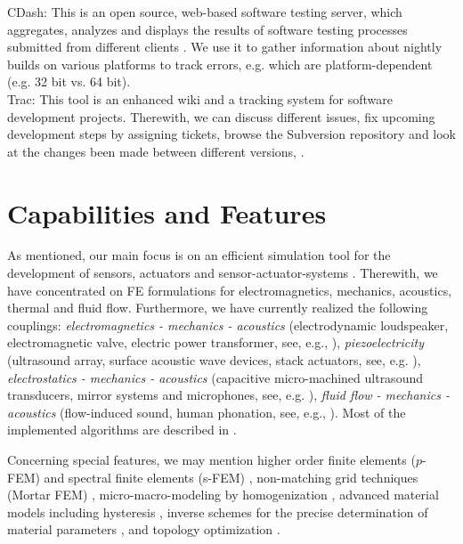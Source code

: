 \noindent
{\sf CDash:} This is  an open source, web-based software testing server,
which  aggregates,  analyzes and  displays  the  results  of software  testing
processes  submitted from  different clients  \cite{cdash}. We
use it to  gather information about nightly builds on various
platforms to track errors, e.g. which are platform-dependent (e.g. 32 bit vs. 64
bit). \\ 

\noindent
{\sf Trac:} This tool is an enhanced wiki and a tracking system
  for software development projects. Therewith, we can discuss
  different issues, fix upcoming development steps by assigning
  tickets, browse the {\sf Subversion} repository and look
  at the changes been made between different versions, \cite{track}.

\section{Capabilities and Features}
As mentioned, our main focus is on an efficient simulation tool for
the development of sensors, actuators and
sensor-actuator-systems \cite{makalten10:12,Kaltenbacher2011e}. Therewith, we have concentrated on FE
formulations for electromagnetics, mechanics, acoustics, thermal and
fluid flow. Furthermore, we have currently realized the
following couplings: {\it electromagnetics - mechanics - acoustics}
(electrodynamic
  loudspeaker, electromagnetic valve, electric power transformer, see, e.g.,
\cite{Kaltenbacher2011b}),
{\it piezoelectricity} (ultrasound array, surface  
  acoustic wave devices, stack actuators, see,
  e.g. \cite{hegewald08:2}), {\it electrostatics - mechanics - acoustics}
(capacitive micro-machined
  ultrasound transducers, mirror systems and microphones, see,
  e.g. \cite{kaltenbacher05:4}),  {\it fluid flow - mechanics -
    acoustics} (flow-induced sound, human phonation, see, e.g.,
  \cite{Link2009}). Most of the
  implemented algorithms are described in \cite{Kaltenbacher2007}.

Concerning special features, we may mention higher order finite
elements ($p$-FEM) and spectral finite elements 
(s-FEM) \cite{hauck06:1,Hueppe2011c,Huppe2011b,Hauck2011}, non-matching
grid techniques (Mortar FEM)
\cite{Triebenbacher2010b}, micro-macro-modeling by
homogenization \cite{kaltenbacher09:8}, advanced material models
including hysteresis \cite{kaltenbacher10:1},
inverse schemes for the precise determination of material parameters
\cite{bkaltenbacher06:3,lahmer08:1}, and topology
optimization \cite{kaltenbacher09:10,wein10:1}.
%

